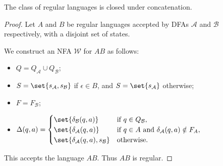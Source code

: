 \begin{theorem} \label{thm:dfa:regular:closure2}
    The class of regular languages is closed under concatenation.
\end{theorem}
\begin{proof}
    Let $A$ and $B$ be regular languages accepted by DFAs $\mathcal{A}$ and
    $\mathcal{B}$ respectively, with a disjoint set of states.

    We construct an NFA $\mathcal{W}$ for $AB$ as follows:
    \begin{itemize}
        \item $Q = Q_{\mathcal{A}} \cup Q_{\mathcal{B}}$;
        \item $S = \set{s_{\mathcal{A}}, s_\mathcal{B}}$ if
            $\epsilon \in B$, and $S = \set{s_\mathcal{A}}$ otherwise;
        \item $F = F_\mathcal{B}$;
        \item $\Delta(q, a) = \begin{cases}
            \set{\delta_\mathcal{B}(q, a)}
                & \text{if } q \in Q_\mathcal{B}, \\
            \set{\delta_\mathcal{A}(q, a)}
                & \text{if } q \in A \text{ and }
                    \delta_\mathcal{A}(q, a) \notin F_A, \\
            \set{\delta_\mathcal{A}(q, a), s_\mathcal{B}}
                & \text{otherwise.}
        \end{cases}$
    \end{itemize}
    This accepts the language $AB$.
    Thus $AB$ is regular.
\end{proof}

